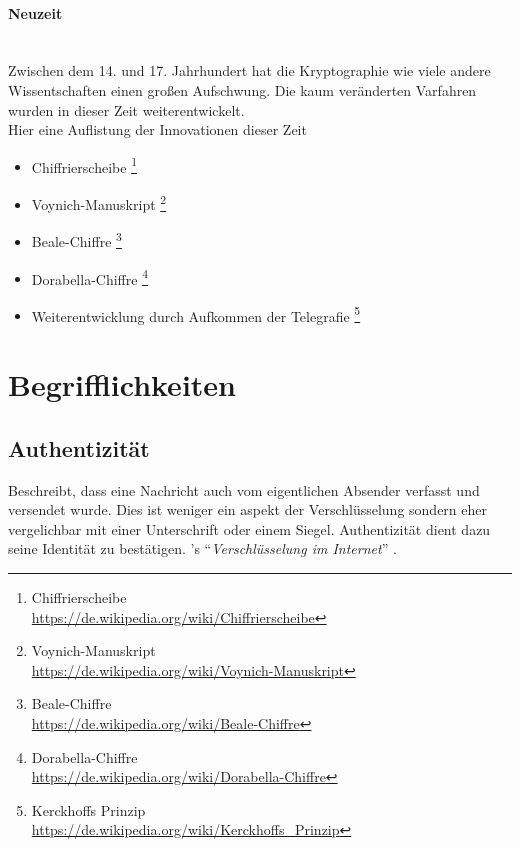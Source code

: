 \paragraph{Neuzeit}
\hfill\\
Zwischen dem 14. und 17. Jahrhundert hat die Kryptographie wie viele andere Wissentschaften einen großen Aufschwung.
Die kaum veränderten Varfahren wurden in dieser Zeit weiterentwickelt.
\\Hier eine Auflistung der Innovationen dieser Zeit
\begin{itemize}
    \item Chiffrierscheibe \footnote{Chiffrierscheibe\\\url{https://de.wikipedia.org/wiki/Chiffrierscheibe}}
    \item Voynich-Manuskript \footnote{Voynich-Manuskript\\\url{https://de.wikipedia.org/wiki/Voynich-Manuskript}}
    \item Beale-Chiffre \footnote{Beale-Chiffre\\\url{https://de.wikipedia.org/wiki/Beale-Chiffre}}
    \item Dorabella-Chiffre \footnote{Dorabella-Chiffre \\\url{https://de.wikipedia.org/wiki/Dorabella-Chiffre}}
    \item Weiterentwicklung durch Aufkommen der Telegrafie \footnote{Kerckhoffs Prinzip \\\url{https://de.wikipedia.org/wiki/Kerckhoffs_Prinzip}}
\end{itemize}


\section{Begrifflichkeiten}

\subsection{Authentizität}
Beschreibt, dass eine Nachricht auch vom eigentlichen Absender verfasst und versendet wurde.
Dies ist weniger ein aspekt der Verschlüsselung sondern eher vergelichbar mit einer Unterschrift oder einem Siegel.
Authentizität dient dazu seine Identität zu bestätigen.
\citeauthor{richter}'s ``\emph{Verschlüsselung im Internet}'' \citep{richter}.

